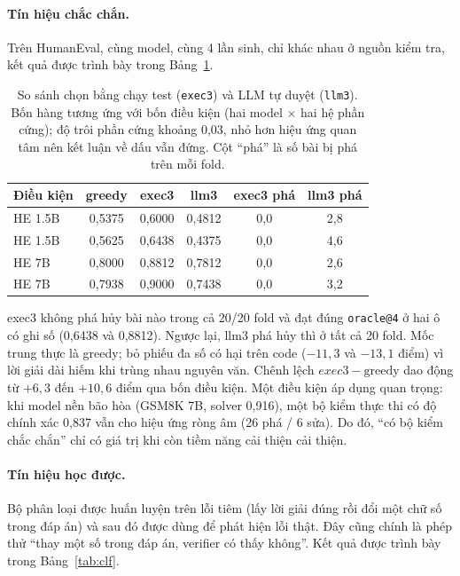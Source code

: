 \paragraph{Tín hiệu chắc chắn.}
Trên HumanEval, cùng model, cùng 4 lần sinh, chỉ khác nhau ở nguồn kiểm tra, kết quả được trình bày trong Bảng~\ref{tab:exec}.

\begin{table}[htbp]
\centering
\small
\begin{tabular}{@{}l c c c c c@{}}
\toprule
Điều kiện & greedy & exec3 & llm3 & exec3 phá & llm3 phá\\
\midrule
HE 1.5B  & 0,5375 & 0,6000 & 0,4812 & 0,0 & 2,8\\
HE 1.5B    & 0,5625 & 0,6438 & 0,4375 & 0,0 & 4,6\\
HE 7B      & 0,8000 & 0,8812 & 0,7812 & 0,0 & 2,6\\
HE 7B   & 0,7938 & 0,9000 & 0,7438 & 0,0 & 3,2\\
\bottomrule
\end{tabular}
\caption{So sánh chọn bằng chạy test (\texttt{exec3}) và LLM tự duyệt (\texttt{llm3}). Bốn hàng tương ứng với bốn điều kiện (hai model $\times$ hai hệ phần cứng); độ trôi phần cứng khoảng 0,03, nhỏ hơn hiệu ứng quan tâm nên kết luận về dấu vẫn đứng. Cột “phá” là số bài bị phá trên mỗi fold. }
\label{tab:exec}
\end{table}

exec3 không phá hủy bài nào trong cả 20/20 fold và đạt đúng \texttt{oracle@4} ở hai ô có ghi số (0,6438 và 0,8812). Ngược lại, llm3 phá hủy thì ở tất cả 20 fold. Mốc trung thực là greedy; bỏ phiếu đa số có hại trên code ($-11{,}3$ và $-13{,}1$ điểm) vì lời giải dài hiếm khi trùng nhau nguyên văn. Chênh lệch $exec3-\text{greedy}$ dao động từ $+6{,}3$ đến $+10{,}6$ điểm qua bốn điều kiện. Một điều kiện áp dụng quan trọng: khi model nền bão hòa (GSM8K 7B, solver 0,916), một bộ kiểm thực thi có độ chính xác 0,837 vẫn cho hiệu ứng ròng âm (26 phá / 6 sửa). Do đó, “có bộ kiểm chắc chắn” chỉ có giá trị khi còn tiềm năng cải thiện cải thiện.

\paragraph{Tín hiệu học được.}
Bộ phân loại được huấn luyện trên lỗi tiêm (lấy lời giải đúng rồi đổi một chữ số trong đáp án) và sau đó được dùng để phát hiện lỗi thật. Đây cũng chính là phép thử “thay một số trong đáp án, verifier có thấy không”. Kết quả được trình bày trong Bảng~\ref{tab:clf}.

